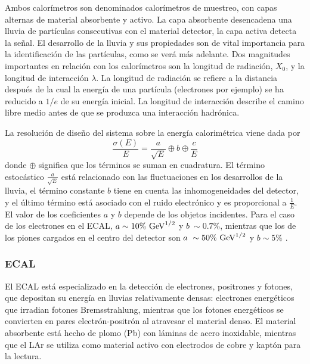 Ambos calorímetros son denominados calorímetros de muestreo, con capas alternas de material absorbente y activo. La capa absorbente desencadena una lluvia de partículas consecutivas con el material detector, la capa activa detecta la señal.
El desarrollo de la lluvia y sus propiedades son de vital importancia para la identificación de las partículas, como se verá más adelante.
Dos magnitudes importantes en relación con los calorímetros son la longitud de radiación, $X_0$, y la longitud de interacción $\lambda$. La longitud de radiación se refiere a la distancia después de la cual la energía de una partícula (electrones por ejemplo) se ha reducido a \(1/e\) de su energía inicial. La longitud de interacción describe el camino libre medio antes de que se produzca una interacción hadrónica.

La resolución de diseño del sistema sobre la energía calorimétrica viene dada por
\begin{equation}
    \frac{\sigma(E)}{E} = 
    \frac{a}{\sqrt{E}} \oplus b \oplus \frac{c}{E}
\end{equation}
donde \(\oplus\) significa que los términos se suman en cuadratura. El término estocástico \(\frac{a}{\sqrt{E}}\) está relacionado con las fluctuaciones en los desarrollos de la lluvia, el término constante \(b\) tiene en cuenta las inhomogeneidades del detector, y el último término está asociado con el ruido electrónico y es proporcional a \(\frac{1}{E}\). El valor de los coeficientes \(a\) y \(b\) depende de los objetos incidentes. Para el caso de los electrones en el \ac{ECAL}, \(a\sim 10\%~\text{GeV}^{1/2}\) y \(b~\sim 0.7\%\), mientras que los de los piones cargados en el centro del detector son \(a~\sim50\%~\text{GeV}^{1/2}\) y \(b\sim5\%\) \cite{ATLAS-Calorimeters-PerformanceRun2}.



\subsubsection{\acf{ECAL}}
\label{subsubsec:atlas:atlas:cals:ecal}

El \ac{ECAL} está especializado en la detección de electrones, positrones y fotones, que depositan su energía en lluvias relativamente densas: electrones energéticos que irradian fotones Bremsstrahlung, mientras que los fotones energéticos se convierten en pares electrón-positrón al atravesar el material denso.
El material absorbente está hecho de plomo (Pb) con láminas de acero inoxidable, mientras que el \ac{LAr} se utiliza como material activo con electrodos de cobre y kaptón para la lectura.



